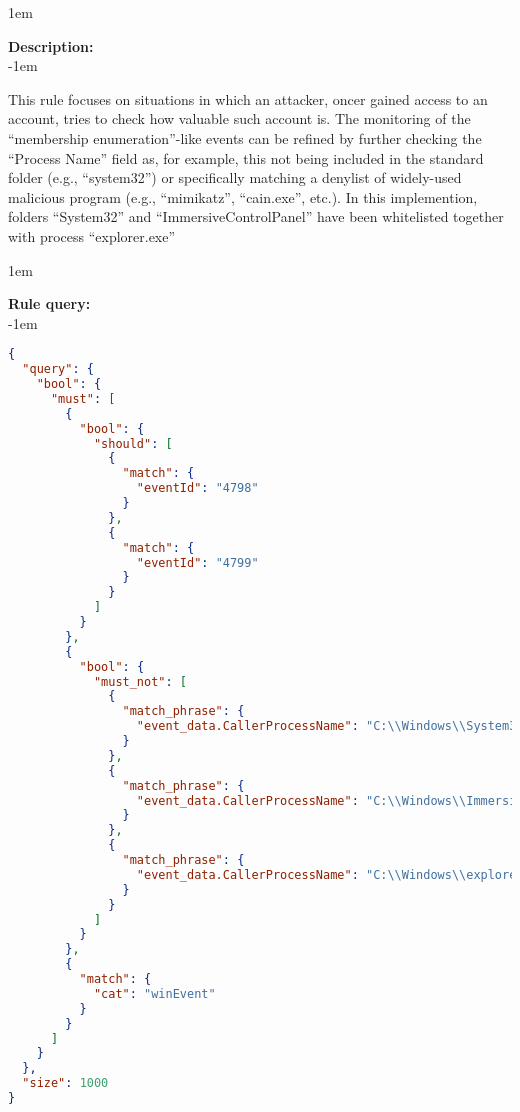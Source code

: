 \openup 1em

{\bf Description:} \\

\openup -1em
\vspace{-2em}


 This rule focuses on situations in which an attacker, oncer gained access to an account, tries to check how valuable such account is. The monitoring of the ``membership enumeration''-like events can be refined by further checking the ``Process Name'' field as, for example, this not being included in the standard folder (e.g., ``system32'') or specifically matching a denylist of widely-used malicious program (e.g., ``mimikatz'', ``cain.exe'', etc.). In this implemention, folders ``System32'' and ``ImmersiveControlPanel'' have been whitelisted together with process ``explorer.exe''

\openup 1em

{\bf Rule query:} \\

\openup -1em
\vspace{-2em}

\begin{lstlisting}[language=json,firstnumber=1]
{
  "query": {
    "bool": {
      "must": [
        {
          "bool": {
            "should": [
              {
                "match": {
                  "eventId": "4798"
                }
              },
              {
                "match": {
                  "eventId": "4799"
                }
              }
            ]
          }
        },
        {
          "bool": {
            "must_not": [
              {
                "match_phrase": {
                  "event_data.CallerProcessName": "C:\\Windows\\System32\\"
                }
              },
              {
                "match_phrase": {
                  "event_data.CallerProcessName": "C:\\Windows\\ImmersiveControlPanel\\"
                }
              },
              {
                "match_phrase": {
                  "event_data.CallerProcessName": "C:\\Windows\\explorer.exe"
                }
              }
            ]
          }
        },
        {
          "match": {
            "cat": "winEvent"
          }
        }
      ]
    }
  },
  "size": 1000
}
\end{lstlisting}

